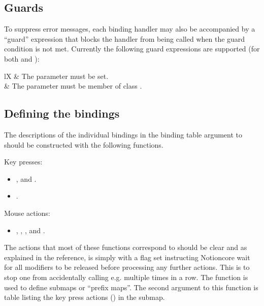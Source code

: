 \subsection{Guards}

To suppress error messages, each binding handler may also be accompanied
by a ``guard'' expression that blocks the handler from being called when
the guard condition is not met. Currently the following guard expressions
are supported (for both  and ):

\begin{tabularx}{\linewidth}{lX}
     & The  parameter must be set. \\
     & The  parameter must be member
      of class . \\
\end{tabularx}


\subsection{Defining the bindings}
\label{sec:binddef}

The descriptions of the individual bindings in the binding table argument
to  should be constructed with the following
functions.

Key presses:
\begin{itemize}
    \item {}, and
          .
    \item {}.
\end{itemize}
Mouse actions:
\begin{itemize}
    \item {},
          ,
          , and
          .
\end{itemize}

The actions that most of these functions correspond to should be clear
and as explained in the reference,  is simply
 with a flag set instructing Notioncore wait for
all modifiers to be released before processing any further actions.
This is to stop one from accidentally calling e.g.
 multiple times in a row. The 
 function is used to define submaps or
``prefix maps''. The second argument to this function is table listing
the key press actions () in the submap. 

